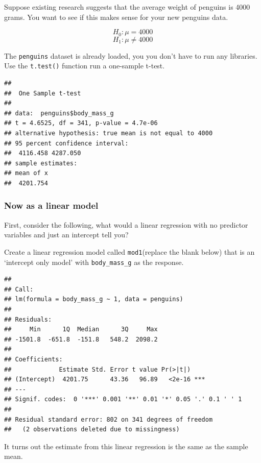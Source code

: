 \documentclass[
]{book}
\newenvironment{Shaded}{\begin{snugshade}}{\end{snugshade}}
\newcommand{\AttributeTok}[1]{\textcolor[rgb]{0.77,0.63,0.00}{#1}}
\newcommand{\CommentTok}[1]{\textcolor[rgb]{0.56,0.35,0.01}{\textit{#1}}}
\newcommand{\ConstantTok}[1]{\textcolor[rgb]{0.00,0.00,0.00}{#1}}
\newcommand{\FunctionTok}[1]{\textcolor[rgb]{0.00,0.00,0.00}{#1}}
\newcommand{\NormalTok}[1]{#1}
\newcommand{\SpecialCharTok}[1]{\textcolor[rgb]{0.00,0.00,0.00}{#1}}
\begin{document}
Suppose existing research suggests that the average weight of penguins is 4000 grams. You want to see if this makes sense for your new penguins data.

\[H_0: \mu = 4000\]
\[H_1: \mu \ne 4000\]

The \texttt{penguins} dataset is already loaded, you you don't have to run any libraries. Use the \texttt{t.test()} function run a one-sample t-test.

\begin{verbatim}
## 
##  One Sample t-test
## 
## data:  penguins$body_mass_g
## t = 4.6525, df = 341, p-value = 4.7e-06
## alternative hypothesis: true mean is not equal to 4000
## 95 percent confidence interval:
##  4116.458 4287.050
## sample estimates:
## mean of x 
##  4201.754
\end{verbatim}

\hypertarget{now-as-a-linear-model}{%
\subsubsection{Now as a linear model}\label{now-as-a-linear-model}}

First, consider the following, what would a linear regression with no predictor variables and just an intercept tell you?

Create a linear regression model called \texttt{mod1}(replace the blank below) that is an `intercept only model' with \texttt{body\_mass\_g} as the response.

\begin{verbatim}
## 
## Call:
## lm(formula = body_mass_g ~ 1, data = penguins)
## 
## Residuals:
##     Min      1Q  Median      3Q     Max 
## -1501.8  -651.8  -151.8   548.2  2098.2 
## 
## Coefficients:
##             Estimate Std. Error t value Pr(>|t|)    
## (Intercept)  4201.75      43.36   96.89   <2e-16 ***
## ---
## Signif. codes:  0 '***' 0.001 '**' 0.01 '*' 0.05 '.' 0.1 ' ' 1
## 
## Residual standard error: 802 on 341 degrees of freedom
##   (2 observations deleted due to missingness)
\end{verbatim}

It turns out the estimate from this linear regression is the same as the sample mean.

\begin{Shaded}
\end{Shaded}
\end{document}
